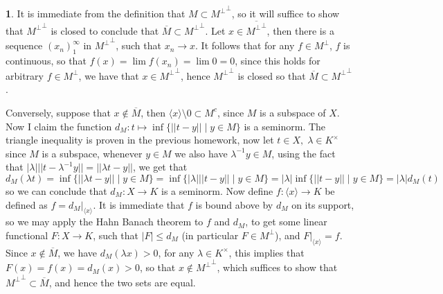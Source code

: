 \documentclass[10.5pt]{article}
\theoremstyle{definition}
\newtheorem{pb}{}
\newcommand{\set}[1]{\{#1\}}
\newcommand{\abs}[1]{\left\vert#1\right\vert}
\newcommand{\norm}[1]{\lvert\lvert#1\rvert\rvert}
\newcommand{\gen}[1]{\langle #1 \rangle}
\begin{document}
        \begin{pb}
            It is immediate from the definition that \(M \subset {M^\perp}^\perp\), so it will suffice to show that \({M^\perp}^\perp\) is closed to conclude that \(\overline{M} \subset {M^\perp}^\perp\). Let \(x \in \overline{{M^\perp}^\perp}\), then there is a sequence \((x_n)_1^\infty\) in \({M^\perp}^\perp\), such that \(x_n \to x\). It follows that for any \(f \in M^\perp\), \(f\) is continuous, so that \(f(x) = \lim f(x_n) = \lim 0 = 0\), since this holds for arbitrary \(f \in M^\perp\), we have that \(x \in {M^\perp}^\perp\), hence \({M^\perp}^\perp\) is closed so that \(\overline{M} \subset {M^\perp}^\perp\).

            Conversely, suppose that \(x \not \in \overline{M}\), then \(\gen{x} \setminus 0 \subset M^c\), since \(M\) is a subspace of \(X\). Now I claim the function \(d_{M}: t \mapsto \inf\set{\norm{t-y} \mid y \in M}\) is a seminorm. The triangle inequality is proven in the previous homework, now let \(t \in X, \; \lambda \in K^\times \) since \(M\) is a subspace, whenever \(y \in M\) we also have \(\lambda^{-1}y \in M\), using the fact that \(\abs{\lambda}\norm{t - \lambda^{-1}y} = \norm{\lambda t - y}\), we get that \[d_M(\lambda t) = \inf\set{\norm{\lambda t - y} \mid y \in M} = \inf\set{\abs{\lambda}\norm{t - y} \mid y \in M} = \abs{\lambda}\inf\set{\norm{t - y} \mid y \in M} = \abs{\lambda}d_M(t)\]
            so we can conclude that \(d_M: X \to K\) is a seminorm. Now define \(f: \gen{x} \to K\) be defined as \(f = d_M \vert_{\gen{x}}\). It is immediate that \(f\) is bound above by \(d_M\) on its support, so we may apply the Hahn Banach theorem to \(f\) and \(d_M\), to get some linear functional \(F: X \to K\), such that \(\abs{F} \leq d_M\) (in particular \(F \in M^\perp\)), and \(F\vert_{\gen{x}} = f\). Since \(x \not \in \overline{M}\), we have \(d_M(\lambda x) > 0\), for any \(\lambda \in K^\times\), this implies that \(F(x) = f(x) = d_M(x) > 0\), so that \(x \not \in {M^{\perp}}^\perp\), which suffices to show that \({M^\perp}^\perp \subset \overline{M}\), and hence the two sets are equal.
        \end{pb}
\end{document}
